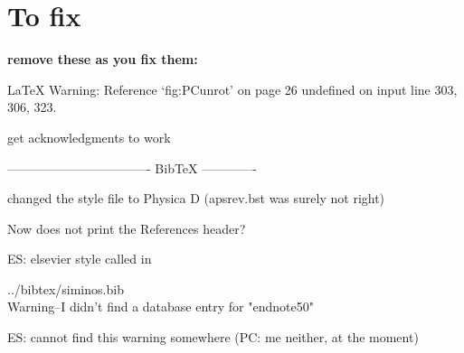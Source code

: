 
\section*{To fix}

{\bf remove these as you fix them:}


LaTeX Warning: Reference `fig:PCunrot' on page 26 undefined on input line 303, 306, 323.

get 
acknowledgments to work

---------------------------------- BibTeX -------------


changed the style file to Physica D (apsrev.bst was surely not right)

Now does not print the References header?

ES: elsevier style called in 

../bibtex/siminos.bib
\\
Warning--I didn't find a database entry for "endnote50"

ES: cannot find this warning somewhere 
(PC: me neither, at the moment)